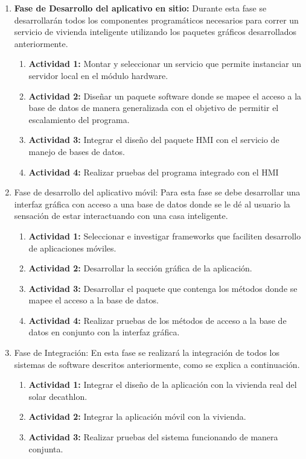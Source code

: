 \begin{enumerate}
\item \textbf{Fase de Desarrollo del aplicativo en sitio:} Durante esta fase se desarrollarán todos los componentes programáticos necesarios para correr un servicio de vivienda inteligente utilizando los paquetes gráficos desarrollados anteriormente.    

	\begin{enumerate}
      \item \textbf{Actividad 1:} Montar y seleccionar un servicio que permite instanciar un  servidor local en el módulo hardware.
      \item \textbf{Actividad 2:} Diseñar un paquete software donde se mapee el acceso a la base de datos de manera generalizada con el objetivo de permitir el escalamiento del programa.
      \item \textbf{Actividad 3:} Integrar el diseño del paquete HMI con el servicio de manejo de bases de datos.
      \item \textbf{Actividad 4:} Realizar pruebas del programa integrado con el HMI
	\end{enumerate}

\item Fase de desarrollo del aplicativo móvil: Para esta fase se debe desarrollar una interfaz gráfica con acceso a una base de datos donde se le dé al usuario la sensación de estar interactuando con una casa inteligente.

    \begin{enumerate}
      \item \textbf{Actividad 1:} Seleccionar e investigar frameworks que faciliten desarrollo de aplicaciones móviles.
      \item \textbf{Actividad 2:} Desarrollar la sección gráfica de la aplicación.
      \item \textbf{Actividad 3:} Desarrollar el paquete que contenga los métodos donde se mapee el acceso a la base de datos.
      \item \textbf{Actividad 4:} Realizar pruebas de los métodos de acceso a la base de datos en conjunto con la interfaz gráfica.
\end{enumerate}

\item Fase de Integración: En esta fase se realizará la integración de todos los sistemas de software descritos anteriormente, como se explica a continuación.

    \begin{enumerate}
      \item \textbf{Actividad 1:} Integrar el diseño de la aplicación con la vivienda real del solar decathlon.
      \item \textbf{Actividad 2:} Integrar la aplicación móvil con la vivienda.
      \item \textbf{Actividad 3:} Realizar pruebas del sistema funcionando de manera conjunta.
    \end{enumerate}

\end{enumerate}
